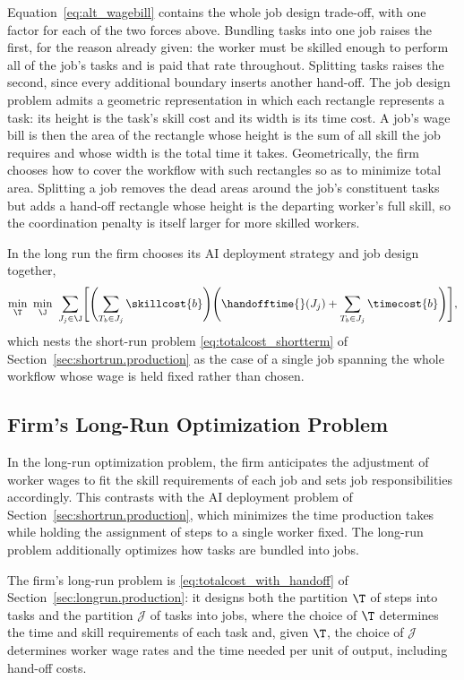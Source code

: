 Equation~\eqref{eq:alt_wagebill} contains the whole job design trade-off, with one factor for each of the two forces above.
Bundling tasks into one job raises the first, for the reason already given: the worker must be skilled enough to perform all of the job's tasks and is paid that rate throughout.
Splitting tasks raises the second, since every additional boundary inserts another hand-off.
The job design problem admits a geometric representation in which each rectangle represents a task: its height is the task's skill cost and its width is its time cost.
A job's wage bill is then the area of the rectangle whose height is the sum of all skill the job requires and whose width is the total time it takes.
Geometrically, the firm chooses how to cover the workflow with such rectangles so as to minimize total area.
Splitting a job removes the dead areas around the job's constituent tasks but adds a hand-off rectangle whose height is the departing worker's full skill, so the coordination penalty is itself larger for more skilled workers.

In the long run the firm chooses its AI deployment strategy and job design together,
\begin{align}
\label{eq:alt_totalcost}
\min_{\T} \ \min_{\J} \
\sum_{J_j \in \J} \Biggl[\Biggl(\sum_{T_b \in J_j} \skillcost{b} \Biggr) \Biggl(\handofftime{}(J_j) + \sum_{T_b \in J_j} \timecost{b} \Biggr)\Biggr],
\end{align}
which nests the short-run problem \eqref{eq:totalcost_shortterm} of Section~\ref{sec:shortrun.production} as the case of a single job spanning the whole workflow whose wage is held fixed rather than chosen.


\subsection{Firm's Long-Run Optimization Problem}
\label{app:jobdesign.longrun}

In the long-run optimization problem, the firm anticipates the adjustment of worker wages to fit the skill requirements of each job and sets job responsibilities accordingly.
This contrasts with the AI deployment problem of Section~\ref{sec:shortrun.production}, which minimizes the time production takes while holding the assignment of steps to a single worker fixed. 
The long-run problem additionally optimizes how tasks are bundled into jobs.

The firm's long-run problem is \eqref{eq:totalcost_with_handoff} of Section~\ref{sec:longrun.production}: it designs both the partition $\T$ of steps into tasks and the partition $\mathcal{J}$ of tasks into jobs, where the choice of $\T$ determines the time and skill requirements of each task and, given $\T$, the choice of $\mathcal{J}$ determines worker wage rates and the time needed per unit of output, including hand-off costs.

